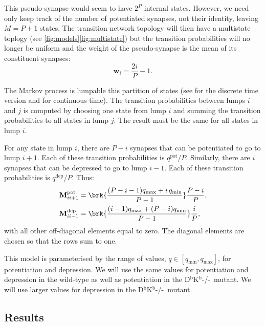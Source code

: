 \documentclass[12pt]{article}
\newcommand{\w}{\mathbf{w}}
\newcommand{\M}{\mathbf{M}}
\newcommand{\pot}{^{\text{pot}}}
\newcommand{\dep}{^{\text{dep}}}
\newcommand{\KO}{D$^\mathrm{b}$K$^\mathrm{b}$-/-}
\newcommand{\lmax}{_{\text{max}}}
\newcommand{\lmin}{_{\text{min}}}
\begin{document}
This pseudo-synapse would seem to have $2^P$ internal states.
However, we need only keep track of the number of potentiated synapses, not their identity, leaving $M=P+1$ states.
The transition network topology will then have a multistate toplogy (see \autoref{fig:models}\ref{fig:multistate}) but the transition probabilities will no longer be uniform and the weight of the pseudo-synapse is the mean of its constituent synapses:
%
\begin{equation}\label{eq:pooledweight}
  \w_i = \frac{2i}{P}-1.
\end{equation}
%


The Markov process is lumpable \wrt this partition of states (see \cite[\S6.3]{kemeny1960finite} for the discrete time version and \cite{burke1958markovian,Ball1993Lumpability} for continuous time).
The transition probabilities between lumps $i$ and $j$ is computed by choosing one state from lump $i$ and summing the transition probabilities to all states in lump $j$.
The result must be the same for all states in lump $i$.

For any state in lump $i$, there are $P-i$ synapses that can be potentiated to go to lump $i+1$.
Each of these transition probabilities is $q\pot/P$.
Similarly, there are $i$ synapses that can be depressed to go to lump $i-1$.
Each of these transition probabilities is $q\dep/P$.
Thus:
%
\begin{equation}\label{eq:pooledpotdep}
  \begin{aligned}
    \M\pot_{ii+1} &=  \brk{\frac{(P-i-1)q\lmax + i\,q\lmin}{P-1}} \frac{P-i}{P}, \\
    \M\dep_{ii-1} &=  \brk{\frac{(i-1)q\lmax + (P-i)q\lmin}{P-1}} \frac{i}{P},
  \end{aligned}
\end{equation}
%
with all other off-diagonal elements equal to zero.
The diagonal elements are chosen so that the rows sum to one.

This model is parameterised by the range of values, $q\in[q\lmin,q\lmax]$, for potentiation and depression.
We will use the same values for potentiation and depression in the wild-type as well as potentiation in the \KO\ mutant.
We will use larger values for depression in the \KO\ mutant.


\subsection{Results}\label{sec:results}
\end{document}
